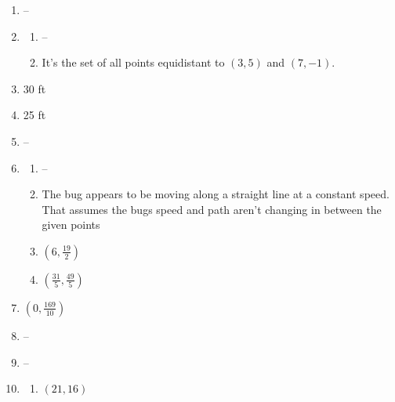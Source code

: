 \documentclass{article}
\begin{document}
\begin{enumerate}
\begin{enumerate}
	\item Yes
	
	\item No
	
	\item If the angle is acute, there can be two non--congruent triangles that have S.S.A. congruencies
	
	\end{enumerate}

\item --

\item
	\begin{enumerate}
	
	\item --
	
	\item It's the set of all points equidistant to $(3,5)$ and $(7,-1)$.
	
	\end{enumerate}

\item 30 ft

\item 25 ft

\item --

\item
	\begin{enumerate}
	
	\item -- 
	
	\item The bug appears to be moving along a straight line at a constant speed. That assumes the bugs speed and path aren't changing in between the given points
	
	\item $(6, \frac{19}{2})$
	
	\item $(\frac{31}{5}, \frac{49}{5})$
	
	\end{enumerate}
	
\item $(0, \frac{169}{10})$

\item --

\item --

\item
	\begin{enumerate}
	
	\item $(21, 16)$
	

\end{enumerate}
\end{enumerate}
\end{document}
